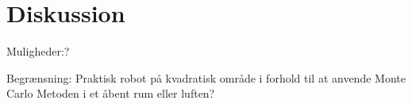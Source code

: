 \documentclass[../../SRP.tex]{subfiles}
\begin{document}
\chapter{Diskussion}

Muligheder:?

Begrænsning: Praktisk robot på kvadratisk område i forhold til at anvende Monte Carlo Metoden i et åbent rum eller luften? 
\end{document}
